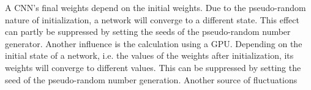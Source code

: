 
A CNN's final weights depend on the initial weights. Due to the pseudo-random nature of initialization, a network will converge to a different state.  This effect can partly be suppressed by setting the seeds of the pseudo-random number generator. Another influence is the calculation using a GPU. 
Depending on the initial state of a network, i.e. the values of the weights after initialization, its weights will converge to different values. This can be suppressed by setting the seed of the pseudo-random number generation. Another source of fluctuations 

















